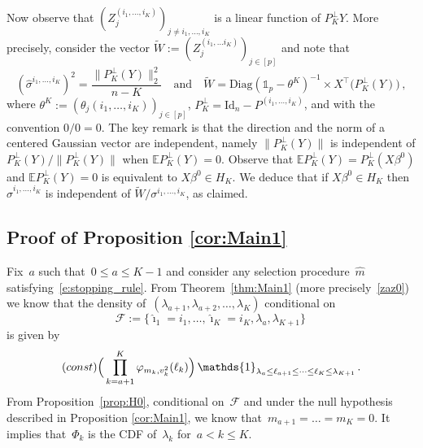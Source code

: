 \documentclass[final,numbib]{imaiai}%
\numberwithin{equation}{section}
\def\eq{\begin{equation}}
\def\qe{\end{equation}}
\renewcommand{\hat}{\widehat}
\renewcommand{\tilde}{\widetilde}
\newcommand{\<}{\langle}
\renewcommand{\>}{\rangle}
\newcommand{\1}{\mathds{1}}
\begin{document}
{Now observe that $(Z^{(i_1,\ldots, i_{K})}_j)_{ j\neq i_1, \ldots, i_{K}}$ is a linear function of $P^\perp_{K}Y$. More precisely, consider the vector $\tilde W:=(Z^{(i_1,\ldots i_K)}_{j})_{j\in[p]}$ and note that 
\[
(\hat \sigma^{i_1,\ldots, i_{K}})^2=\frac{\|P_K^\perp(Y)\|_2^2}{n-K}
\quad\mathrm{and}\quad
\tilde W=\mathrm{Diag}(\mathds{1}_p-\theta^K)^{-1}\times X^\top\big(P_K^\perp(Y)\big)\,,
\]
where $\theta^K:=(\theta_{j}(i_1,\ldots, i_K))_{j\in[p]}$, $P_K^\perp=\mathrm{Id}_n-P^{(i_1,\ldots, i_K)}$, and with the convention $0/0=0$. The key remark is that the direction and the norm of a centered Gaussian vector are independent, namely $\|P_K^\perp(Y)\|$ is independent of $P_K^\perp(Y)/\|P_K^\perp(Y)\|$ when $\mathds EP_K^\perp(Y)=0$. Observe that $\mathds EP_K^\perp(Y)=P_K^\perp(X\beta^0)$ and $\mathds EP_K^\perp(Y)=0$ is equivalent to $X\beta^0\in H_K$. We deduce that if $X\beta^0\in H_K$ then $\hat \sigma^{i_1,\ldots, i_{K}}$ is independent of $\tilde W/\sigma^{i_1,\ldots, i_{K}}$, as claimed.



\subsection{Proof of Proposition \ref{cor:Main1} } 
\label{proof:cor4}
Fix~$a$ such that~$0\leq a\leq K-1$ and consider any selection procedure~$\hat m$ satisfying~\eqref{e:stopping_rule}. From Theorem~\ref{thm:Main1} (more precisely~\eqref{zaz0}) we know that the density of~$(\lambda_{a+1},\lambda_{a+2},\ldots,\lambda_K)$ conditional on 
\[
 \mathcal F:=\big\{\hat \imath_1 =i_1, \ldots, \hat \imath_{K}=i_{K}, \lambda_a,\lambda_{K+1}\big\}\,
 \]
 is given by 
    \eq
    \notag
    (const)   \Big(\prod_{k=a+1}^K \varphi_{m_k,v_k^2}(\ell_k)\Big)\, \1_{\lambda_a \leq \ell_{a+1}\leq \cdots \leq \ell_K\leq  \lambda_{K+1}}\,.
   \qe
   From Proposition~\ref{prop:H0}, conditional on~$\mathcal F$ and under the null hypothesis described in Proposition \ref{cor:Main1}, we know that~$m_{a+1}=\ldots=m_K=0$. It implies that~$\Phi_k$ is the CDF of~$\lambda_k$ for~$a<k\leq K$. 
 
}
\end{document}

